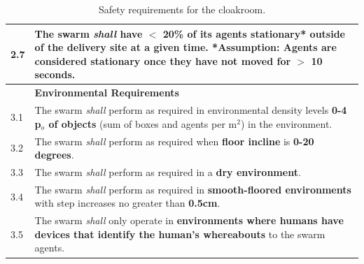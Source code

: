 \documentclass[runningheads]{llncs}
\begin{document}
\begin{table}[!t]
\begin{tabular}{p{5mm} p{116mm} }
		\hline
		2.7 & The swarm \emph{shall} have \textbf{$<$ 20\%} of its agents \textbf{stationary*} outside of the \textbf{delivery site} at a given time.
		*Assumption: Agents are considered stationary once they have not moved for $>$ \textbf{10 seconds}. \\
		\hline
		& \textbf{Environmental Requirements}\\
		\hline
		3.1 & The swarm \emph{shall} perform as required in environmental density levels \textbf{0-4 p$_o$ of objects} (sum of boxes and agents per m$^2$) in the environment. %
		\\ 
		\hline
		3.2 & The swarm \emph{shall} perform as required when \textbf{floor incline} is \textbf{0-20 degrees}.
		\\ 
		\hline
		3.3 & The swarm \emph{shall} perform as required in a \textbf{dry environment}.
		\\ 
		\hline
		3.4 & The swarm \emph{shall} perform as required in \textbf{smooth-floored environments} with step increases no greater than \textbf{0.5cm}.
		\\ 
		\hline
		3.5 & The swarm \emph{shall} only operate in \textbf{environments where humans have devices that identify the human’s whereabouts} to the swarm agents.
		\\		[1ex] 		
		\hline
	\end{tabular}
	\caption{\label{tab:reqs}Safety requirements for the cloakroom.}
	\vspace{-4ex}
\end{table}
\end{document}
